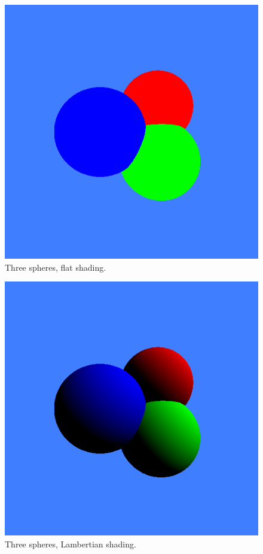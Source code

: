 \documentclass{article}
\begin{document}
\begin{description}
\begin{description}
\begin{figure}
  \centerline{\includegraphics[scale=0.5]{threeflatspheres.png}}
  \caption{Three spheres, flat shading.}
  \label{spheresflat}
\end{figure}

\begin{figure}
  \centerline{\includegraphics[scale=0.5]{threelambertianspheres.png}}
  \caption{Three spheres, Lambertian shading.}
  \label{sphereslambertian}
\end{figure}


\end{description}
\end{description}
\end{document}

